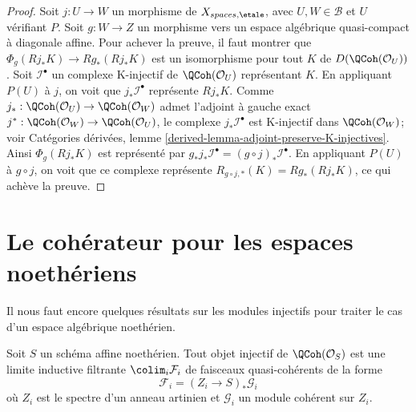 \begin{proof}
\medskip\noindent
Soit $j : U \to W$ un morphisme de $X_{spaces, \etale}$, avec
$U,W \in \mathcal{B}$ et $U$ v\'erifiant $P$. Soit $g : W \to Z$ un
morphisme vers un espace alg\'ebrique quasi-compact \`a diagonale affine.
Pour achever la preuve, il faut montrer que
$\Phi_g(Rj_*K) \to Rg_*(Rj_*K)$
est un isomorphisme pour tout $K$ de $D(\QCoh(\mathcal{O}_U))$.
Soit $\mathcal{I}^\bullet$ un complexe K-injectif de
$\QCoh(\mathcal{O}_U)$ repr\'esentant $K$. En appliquant $P(U)$ \`a $j$, on
voit que $j_*\mathcal{I}^\bullet$ repr\'esente $Rj_*K$. Comme
$j_* : \QCoh(\mathcal{O}_U) \to \QCoh(\mathcal{O}_W)$ admet l'adjoint \`a
gauche exact $j^* : \QCoh(\mathcal{O}_W) \to \QCoh(\mathcal{O}_U)$, le
complexe $j_*\mathcal{I}^\bullet$ est K-injectif dans
$\QCoh(\mathcal{O}_W)$; voir Cat\'egories d\'eriv\'ees, lemme
\ref{derived-lemma-adjoint-preserve-K-injectives}. Ainsi
$\Phi_g(Rj_*K)$ est repr\'esent\'e par
$g_*j_*\mathcal{I}^\bullet = (g \circ j)_*\mathcal{I}^\bullet$.
En appliquant $P(U)$ \`a $g \circ j$, on voit que ce complexe repr\'esente
$R_{g \circ j, *}(K) = Rg_*(Rj_*K)$, ce qui ach\`eve la preuve.
\end{proof}









\section{Le coh\'erateur pour les espaces noeth\'eriens}
\label{section-coherator-Noetherian}

\noindent
Il nous faut encore quelques r\'esultats sur les modules injectifs pour traiter
le cas d'un espace alg\'ebrique noeth\'erien.

\begin{lemma}
\label{lemma-affine-injective-colimit-direct-sum-pushforwards-artin}
Soit $S$ un sch\'ema affine noeth\'erien. Tout objet injectif de
$\QCoh(\mathcal{O}_S)$ est une limite inductive filtrante
$\colim_i \mathcal{F}_i$ de faisceaux quasi-coh\'erents de la forme
$$
\mathcal{F}_i = (Z_i \to S)_*\mathcal{G}_i
$$
o\`u $Z_i$ est le spectre d'un anneau artinien et $\mathcal{G}_i$ un module
coh\'erent sur $Z_i$.
\end{lemma}

